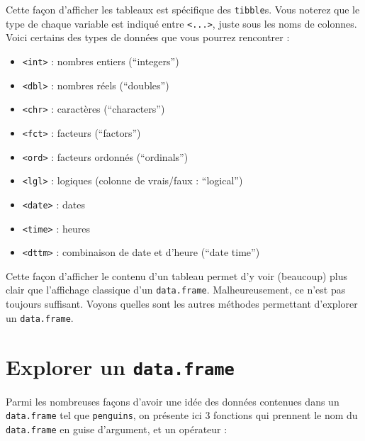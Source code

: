 \documentclass[
  letterpaper,
  DIV=11,
  numbers=noendperiod]{scrreprt}
\providecommand{\tightlist}{%
  \setlength{\itemsep}{0pt}\setlength{\parskip}{0pt}}\usepackage{longtable,booktabs,array}
\begin{document}
Cette façon d'afficher les tableaux est spécifique des \texttt{tibble}s.
Vous noterez que le type de chaque variable est indiqué entre
\texttt{\textless{}...\textgreater{}}, juste sous les noms de colonnes.
Voici certains des types de données que vous pourrez rencontrer :

\begin{itemize}
\tightlist
\item
  \texttt{\textless{}int\textgreater{}} : nombres entiers (``integers'')
\item
  \texttt{\textless{}dbl\textgreater{}} : nombres réels (``doubles'')
\item
  \texttt{\textless{}chr\textgreater{}} : caractères (``characters'')
\item
  \texttt{\textless{}fct\textgreater{}} : facteurs (``factors'')
\item
  \texttt{\textless{}ord\textgreater{}} : facteurs ordonnés
  (``ordinals'')
\item
  \texttt{\textless{}lgl\textgreater{}} : logiques (colonne de
  vrais/faux : ``logical'')
\item
  \texttt{\textless{}date\textgreater{}} : dates
\item
  \texttt{\textless{}time\textgreater{}} : heures
\item
  \texttt{\textless{}dttm\textgreater{}} : combinaison de date et
  d'heure (``date time'')
\end{itemize}

Cette façon d'afficher le contenu d'un tableau permet d'y voir
(beaucoup) plus clair que l'affichage classique d'un
\texttt{data.frame}. Malheureusement, ce n'est pas toujours suffisant.
Voyons quelles sont les autres méthodes permettant d'explorer un
\texttt{data.frame}.

\hypertarget{explorer-un-data.frame}{%
\section{\texorpdfstring{Explorer un
\texttt{data.frame}}{Explorer un data.frame}}\label{explorer-un-data.frame}}

Parmi les nombreuses façons d'avoir une idée des données contenues dans
un \texttt{data.frame} tel que \texttt{penguins}, on présente ici 3
fonctions qui prennent le nom du \texttt{data.frame} en guise
d'argument, et un opérateur :
\end{document}
